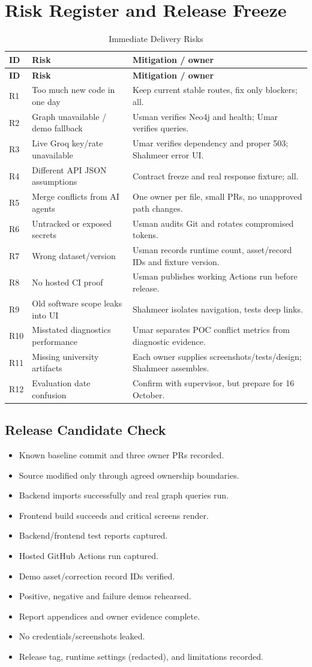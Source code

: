 \documentclass[11pt,a4paper,oneside]{report}
\newcommand{\task}[1]{\item[$\square$] #1}
\begin{document}
\chapter{Risk Register and Release Freeze}
\begin{longtable}{P{1.2cm}P{3.5cm}P{6.5cm}}
\caption{Immediate Delivery Risks}\\\toprule\textbf{ID} & \textbf{Risk} & \textbf{Mitigation / owner}\\\midrule\endfirsthead\toprule\textbf{ID} & \textbf{Risk} & \textbf{Mitigation / owner}\\\midrule\endhead
R1 & Too much new code in one day & Keep current stable routes, fix only blockers; all.\\
R2 & Graph unavailable / demo fallback & Usman verifies Neo4j and health; Umar verifies queries.\\
R3 & Live Groq key/rate unavailable & Umar verifies dependency and proper 503; Shahmeer error UI.\\
R4 & Different API JSON assumptions & Contract freeze and real response fixture; all.\\
R5 & Merge conflicts from AI agents & One owner per file, small PRs, no unapproved path changes.\\
R6 & Untracked or exposed secrets & Usman audits Git and rotates compromised tokens.\\
R7 & Wrong dataset/version & Usman records runtime count, asset/record IDs and fixture version.\\
R8 & No hosted CI proof & Usman publishes working Actions run before release.\\
R9 & Old software scope leaks into UI & Shahmeer isolates navigation, tests deep links.\\
R10 & Misstated diagnostics performance & Umar separates POC conflict metrics from diagnostic evidence.\\
R11 & Missing university artifacts & Each owner supplies screenshots/tests/design; Shahmeer assembles.\\
R12 & Evaluation date confusion & Confirm with supervisor, but prepare for 16 October.\\
\bottomrule\end{longtable}

\section{Release Candidate Check}
\begin{itemize}
\task{Known baseline commit and three owner PRs recorded.}
\task{Source modified only through agreed ownership boundaries.}
\task{Backend imports successfully and real graph queries run.}
\task{Frontend build succeeds and critical screens render.}
\task{Backend/frontend test reports captured.}
\task{Hosted GitHub Actions run captured.}
\task{Demo asset/correction record IDs verified.}
\task{Positive, negative and failure demos rehearsed.}
\task{Report appendices and owner evidence complete.}
\task{No credentials/screenshots leaked.}
\task{Release tag, runtime settings (redacted), and limitations recorded.}
\end{itemize}
\end{document}
